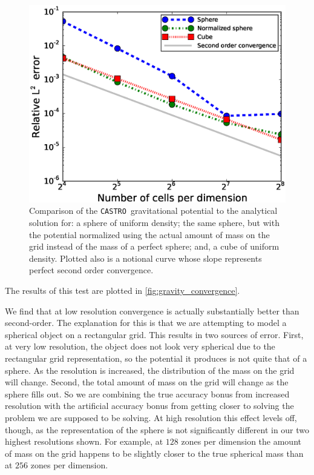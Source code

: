 \documentclass[iop]{../emulateapj}
\newcommand{\castro}{\texttt{CASTRO}}
\begin{document}
\begin{figure}[h]
  \centering
  \includegraphics[scale=0.45]{plots/phi_comparison}
  \caption{Comparison of the \castro\ gravitational potential to the analytical solution for: 
    a sphere of uniform density; the same sphere, but with the potential normalized using the 
    actual amount of mass on the grid instead of the mass of a perfect sphere; and, a 
    cube of uniform density. Plotted also is a notional curve whose slope represents
    perfect second order convergence.\label{fig:gravity_convergence}}
\end{figure}
The results of this test are plotted in \autoref{fig:gravity_convergence}. 

We find that at low resolution convergence is actually substantially better 
than second-order. The explanation for this is that we are attempting to 
model a spherical object on a rectangular grid. This results in two sources of error.
First, at very low resolution, the object does not look very spherical due to the rectangular 
grid representation, so the potential it produces is not quite that of a sphere. 
As the resolution is increased, the distribution of the mass on the grid will change.
Second, the total amount of mass on the grid will change as the sphere fills out. 
So we are combining the true accuracy bonus from increased resolution 
with the artificial accuracy bonus from getting closer to solving the problem 
we are supposed to be solving. At high resolution this effect levels off, though, 
as the representation of the sphere is not significantly different in 
our two highest resolutions shown. For example, at $128$ zones per dimension 
the amount of mass on the grid happens to be slightly closer to the true spherical 
mass than at $256$ zones per dimension.
\end{document}
